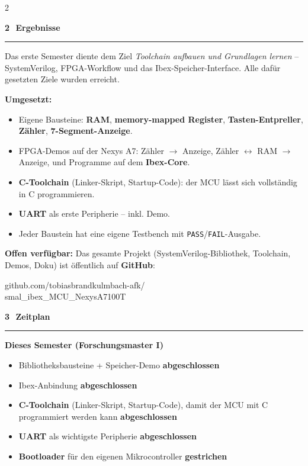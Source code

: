 \documentclass[25pt]{extarticle}
\newcommand{\posterheading}[1]{%
  \par\vspace{4mm}%
  {\fontsize{44}{52}\selectfont\bfseries #1}%
  \par\vspace{3mm}%
  {\color{accentcolor}\rule{\linewidth}{1.5mm}}%
  \par\vspace{4mm}%
}
\newcommand{\subheading}[1]{%
  \par\vspace{3mm}%
  {\fontsize{32}{38}\selectfont\bfseries #1}\par\vspace{1mm}%
}
\newcommand{\done}{\hfill {\color{donegreen}\bfseries abgeschlossen}}
\newcommand{\dropped}{\hfill {\color{fhvsalmon}\bfseries gestrichen}}
\begin{document}
\begin{multicols}{2}

\posterheading{2\,~Ergebnisse}

Das erste Semester diente dem Ziel \emph{Toolchain aufbauen und
Grundlagen lernen} -- SystemVerilog, FPGA-Workflow und das
Ibex-Speicher-Interface. Alle daf\"ur gesetzten Ziele wurden erreicht.

\smallskip
\textbf{Umgesetzt:}
\begin{itemize}
  \item Eigene Bausteine: \textbf{RAM}, \textbf{memory-mapped Register},
        \textbf{Tasten-Entpreller}, \textbf{Z\"ahler},
        \textbf{7-Segment-Anzeige}.
  \item FPGA-Demos auf der Nexys A7: Z\"ahler $\rightarrow$ Anzeige,
        Z\"ahler $\leftrightarrow$ RAM $\rightarrow$ Anzeige, und
        Programme auf dem \textbf{Ibex-Core}.
  \item \textbf{C-Toolchain} (Linker-Skript, Startup-Code): der MCU
        l\"asst sich vollst\"andig in C programmieren.
  \item \textbf{UART} als erste Peripherie -- inkl. Demo.
  \item Jeder Baustein hat eine eigene Testbench mit
        \texttt{PASS}/\texttt{FAIL}-Ausgabe.
\end{itemize}

\smallskip
\textbf{Offen verf\"ugbar:} Das gesamte Projekt (SystemVerilog-Bibliothek,
Toolchain, Demos, Doku) ist \"offentlich auf \textbf{GitHub}:

\noindent\begin{minipage}{\linewidth}
\ttfamily github.com/tobiasbrandkulmbach-afk/\\
smal\_ibex\_MCU\_NexysA7100T
\end{minipage}

\posterheading{3\,~Zeitplan}

\subheading{Dieses Semester (Forschungsmaster I)}
\begin{itemize}
  \item Bibliotheksbausteine + Speicher-Demo \done
  \item Ibex-Anbindung \done
  \item \textbf{C-Toolchain} (Linker-Skript, Startup-Code), damit der
        MCU mit C programmiert werden kann \done
  \item \textbf{UART} als wichtigste Peripherie \done
  \item {\color{fhvsalmon}\textbf{Bootloader} f\"ur den eigenen
        Mikrocontroller} \dropped
\end{itemize}


\end{multicols}
\end{document}
